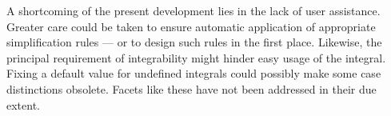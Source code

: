 A shortcoming of the present development lies in the lack of
user assistance. Greater care could be taken to ensure automatic
application of appropriate simplification rules --- or to design such
rules in the first place. Likewise, the principal requirement of
integrability might hinder easy usage of the integral. Fixing a
default value for undefined integrals could possibly make some case
distinctions obsolete. Facets like these have not been addressed in
their due extent.

